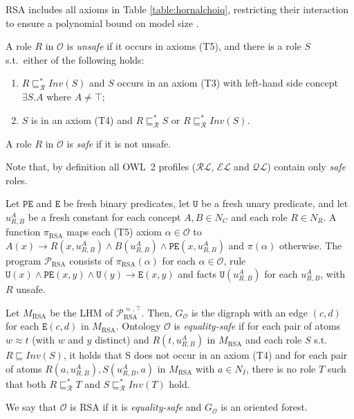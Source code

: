 \documentclass[runningheads]{llncs}
\begin{document}
RSA includes all axioms in Table \ref{table:hornalchoiq}, restricting their interaction to ensure a polynomial bound on model size \cite{carral2014}.

\begin{definition}\label{def:role_safety}
    A role $R$ in $\mathcal{O}$ is \emph{unsafe} if it occurs in axioms (T5), and there is a role $S$ s.t.\ either of the following holds:
    \begin{enumerate}
        \item
            $R \sqsubseteq^*_\mathcal{R} Inv(S)$ and $S$ occurs in an axiom (T3) with left-hand side concept $\exists S . A$ where $A \neq \top$;
        \item
            $S$ is in an axiom (T4) and $R \sqsubseteq^*_\mathcal{R} S$ or $R \sqsubseteq^*_\mathcal{R} Inv(S)$.
    \end{enumerate}

    A role $R$ in $\mathcal{O}$ is \emph{safe} if it is not unsafe.
\end{definition}

Note that, by definition all OWL~2 profiles ($\mathcal{RL}$, $\mathcal{EL}$ and $\mathcal{QL}$) contain only \emph{safe} roles.

\begin{definition}\label{def:rsa_ontology}
    Let $\texttt{PE}$ and $\texttt{E}$ be fresh binary predicates, let $\texttt{U}$ be a fresh unary predicate, and let $u^A_{R,B}$ be a fresh constant for each concept $A, B \in N_C$ and each role $R \in N_R$.
    A function $\pi_\text{RSA}$ maps each (T5) axiom $\alpha \in \mathcal{O}$ to $A(x) \rightarrow R(x, u^A_{R,B}) \land B(u^A_{R,B}) \land \texttt{PE}(x,u^A_{R,B})$ and $\pi(\alpha)$ otherwise.
    The program $\mathcal{P}_\text{RSA}$ consists of $\pi_\text{RSA}(\alpha)$ for each $\alpha \in \mathcal{O}$, rule $\texttt{U}(x) \land \texttt{PE}(x,y) \land \texttt{U}(y) \rightarrow \texttt{E}(x,y)$ and facts $\texttt{U}(u^A_{R,B})$ for each $u^A_{R,B}$, with $R$ unsafe.

    Let $M_\text{RSA}$ be the LHM of $\mathcal{P}_\text{RSA}^{\approx,\top}$.
    Then, $G_\mathcal{O}$ is the digraph with an edge $(c,d)$ for each $\texttt{E}(c,d)$ in $M_\text{RSA}$.
    Ontology $\mathcal{O}$ is \emph{equality-safe} if for each pair of atoms $w \approx t$ (with $w$ and $y$ distinct) and $R(t,u^A_{R,B})$ in $M_\text{RSA}$ and each role $S$ s.t. $R \sqsubseteq Inv(S)$, it holds that S does not occur in an axiom (T4) and for each pair of atoms $R(a,u^A_{R,B}), S(u^A_{R,B},a)$ in $M_\text{RSA}$ with $a \in N_I$, there is no role $T$ such that both $R \sqsubseteq^*_\mathcal{R} T$ and $S \sqsubseteq^*_\mathcal{R} Inv(T)$ hold.

    We say that $\mathcal{O}$ is RSA if it is \emph{equality-safe} and $G_\mathcal{O}$ is an oriented forest.
\end{definition}
\end{document}
